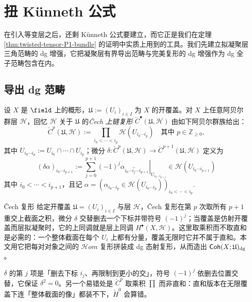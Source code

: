 \section{扭 Künneth 公式\label{sec:kunneth-formula}}
在引入等变层之后，还剩 Künneth 公式要建立，而它正是我们在定理 \ref{thm:twisted-tensor-P1-bundle} 的证明中实质上用到的工具。我们先建立拟凝聚层三角范畴的 dg 增强，它把凝聚层有界导出范畴与完美复形的 dg 增强作为 dg 全子范畴包含在内。

\subsection{导出 dg 范畴}

设 $X$ 是 $\field$ 上的概形，$\mathfrak{U}:=(U_i)_{i\in I}$ 为 $X$ 的开覆盖。对 $X$ 上任意阿贝尔群层 $\mathcal{H}$，回忆 $\mathcal{H}$ 关于 $\mathfrak{U}$ 的\emph{Čech 上链复形} $\check{C}^{\bullet}(\mathfrak{U},\mathcal{H})$ 由如下阿贝尔群族给出：
$$
\check{C}^p(\mathfrak{U},\mathcal{H})
:=
\prod_{i_0<\cdots<i_p}
\mathcal{H}\left(U_{i_0\cdots i_p}\right)
\quad\text{其中 }
p\in\mathbb{Z}_{\ge0},
$$
其中 $U_{i_0\cdots i_p}:=U_{i_0}\cap\cdots\cap U_{i_p}$；微分
$
\delta:
\check{C}^p(\mathfrak{U},\mathcal{H})
\rightarrow
\check{C}^{p+1}(\mathfrak{U},\mathcal{H})
$
定义为
$$
\left(\delta\alpha\right)_{i_0\cdots i_{p+1}}
:=
\sum_{j=0}^{p+1}
(-1)^j
\left.\alpha_{i_0\cdots\hat{i_j}\cdots i_{p+1}}\right|_{U_{i_0\cdots i_{p+1}}}
\in
\mathcal{H}(U_{i_0\cdots i_{p+1}})
$$
其中 $i_0<\cdots<i_{p+1}$，且记
$
\alpha
=
\left(
\alpha_{i_0\cdots i_p}
\in\mathcal{H}(U_{i_0\cdots i_p})
\right)_{i_0<\cdots<i_p}.
$

\begin{conceptbox}{Čech 复形}
给定开覆盖 $\mathfrak{U}=(U_i)_{i\in I}$ 与层 $\mathcal{H}$，Čech 复形在第 $p$ 次取所有 $p+1$ 重交上截面之积，微分 $\delta$ 交替删去一个下标并带符号 $(-1)^j$；当覆盖是仿射开覆盖而层拟凝聚时，它的上同调就是层上同调 $H^{\bullet}(X,\mathcal{H})$。这里取乘积而不取直和是必需的：一个整体截面在每个 $U_i$ 上都有分量，覆盖无限时它并不属于直和。本文用它把每对对象之间的 $\mathcal{H}om$ 复形拼装成 dg 态射复形，从而造出 $\operatorname{\mathsf{Coh}}(X;\mathfrak{U})_{\operatorname{\operatorname{dg}}}$。
\par\smallskip{}
\end{conceptbox}

\begin{yizhu}
$\delta$ 的第 $j$ 项是「删去下标 $i_j$、再限制到更小的交」，符号 $(-1)^j$ 依删去位置交替，它保证 $\delta^2=0$。另一个易错处是 $\check{C}^p$ 取乘积 $\prod$ 而非直和：直和版本在无限覆盖下连「整体截面的像」都装不下，$\check{H}^0$ 会算错。
\end{yizhu}

